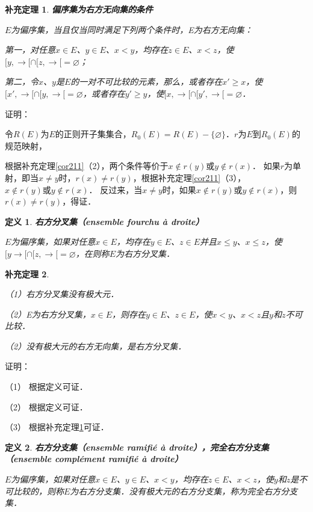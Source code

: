 \documentclass[12pt, a4paper, oneside]{book}
\newtheorem{cor}{补充定理}
\newtheorem{de}{定义}
\begin{document}
			\begin{cor}\label{cor212}
				\textbf{偏序集为右方无向集的条件}
				\par
				$E$为偏序集，当且仅当同时满足下列两个条件时，E为右方无向集：
				\par
				第一，对任意$x\in E$、$y\in E$、$x<y$，均存在$z\in E$、$x<z$，使$[y, \to [\cap[z, \to [=\varnothing$；
				\par
				第二，令$x$、$y$是$E$的一对不可比较的元素，那么，或者存在$x'\geq x$，使$[x', \to [\cap [y, \to [=\varnothing$，或者存在$y'\geq y$，使$[x, \to [\cap [y', \to [=\varnothing$．
			\end{cor}
			证明：
			\par
			令$R(E)$为$E$的正则开子集集合，$R_0(E)=R(E)-\{\varnothing\}$．$r$为$E$到$R_0(E)$的规范映射，
			\par
			根据补充定理\ref{cor211}（2），两个条件等价于$x\notin r(y)\text{或}y\notin r(x)$．
			如果$r$为单射，即当$x\neq y$时，$r(x)\neq r(y)$，根据补充定理\ref{cor211}（3），$x\notin r(y)\text{或}y\notin r(x)$．
			反过来，当$x\neq y$时，如果$x\notin r(y)\text{或}y\notin r(x)$，则$r(x)\neq r(y)$，得证．

			\begin{de}
				\textbf{右方分叉集（ensemble fourchu à droite）}
				\par
				$E$为偏序集，如果对任意$x\in E$，均存在$y\in E$、$z\in E$并且$x\leq y$、$x\leq z$，使$[y \to [\cap [z, \to [=\varnothing$，在则称$E$为右方分叉集．
			\end{de}
			
			\begin{cor}\label{cor213}
				\hfill\par
				（1）右方分叉集没有极大元．
				\par
				（2）E为右方分叉集，$x\in E$，则存在$y\in E$、$z\in E$，使$x<y$、$x<z$且$y$和$z$不可比较．
				\par
				（2）没有极大元的右方无向集，是右方分叉集．
			\end{cor}
			证明：
			\par
			（1）	根据定义可证．
			\par
			（2）	根据定义可证．
			\par
			（3）	根据补充定理\ref{cor212}可证．
			
			\begin{de}
				\textbf{右方分支集（ensemble ramifié à droite），完全右方分支集（ensemble complément ramifié à droite）}
				\par
				$E$为偏序集，如果对任意$x\in E$、$y\in E$、$x<y$，均存在$z\in E$、$x<z$，使$y$和$z$是不可比较的，则称$E$为右方分支集．没有极大元的右方分支集，称为完全右方分支集．
			\end{de}
			
\end{document}
